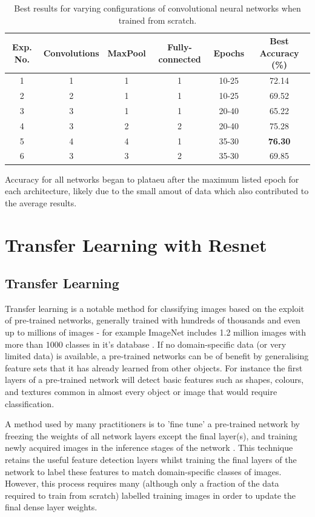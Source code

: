 \documentclass[fleqn,twoside,12pt]{report}
\begin{document}
\begin{table}[h]
	\centering
	\caption{Best results for varying configurations of convolutional neural networks when trained from scratch.}
	\label{tab:networks}
	\begin{tabular}{cccccc} 
		\toprule
		Exp. No.  & Convolutions & MaxPool & Fully-connected & Epochs & Best Accuracy (\%) \\ [0.5ex] 
		\midrule
		1 & 1 & 1 & 1 & 10-25 & 72.14 \\
		2 & 2 & 1 & 1 & 10-25 & 69.52 \\
		3 & 3 & 1 & 1 & 20-40 & 65.22 \\
		4 & 3 & 2 & 2 & 20-40 & 75.28 \\
		5 & 4 & 4 & 1 & 35-30 & \textbf{76.30} \\
		6 & 3 & 3 & 2 & 35-30 & 69.85 \\
		\bottomrule
	\end{tabular}
\end{table}




Accuracy for all networks began to plataeu after the maximum listed epoch for each architecture, likely due to the small amout of data which also contributed to the average results. 


\section{Transfer Learning with Resnet}


\subsection{Transfer Learning}

Transfer learning is a notable method for classifying images based on the exploit of pre-trained networks, generally trained with hundreds of thousands and even up to millions of images - for example ImageNet includes 1.2 million images with more than 1000 classes in it's database \cite{shin}. If no domain-specific data (or very limited data) is available, a pre-trained networks can be of benefit by generalising feature sets that it has already learned from other objects. For instance the first layers of a pre-trained network will detect basic features such as shapes, colours, and textures common in almost every object or image that would require classification. 

A method used by many practitioners is to 'fine tune' a pre-trained network by freezing the weights of all network layers except the final layer(s), and training newly acquired images in the inference stages of the network \cite{girshick}. This technique retains the useful feature detection layers whilst training the final layers of the network to label these features to match domain-specific classes of images. However, this process requires many (although only a fraction of the data required to train from scratch) labelled training images in order to update the final dense layer weights. 
\end{document}
